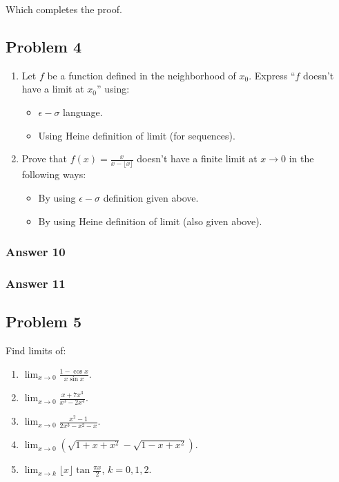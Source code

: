 \documentclass[a4paper]{article}
\begin{document}
Which completes the proof.
\subsection{Problem 4}
\label{sec-1-4}
\begin{enumerate}
\item Let $f$ be a function defined in the neighborhood of $x_0$.
Express ``$f$ doesn't have a limit at $x_0$'' using:
\begin{itemize}
\item $\epsilon-\sigma$ language.
\item Using Heine definition of limit (for sequences).
\end{itemize}

\item Prove that $f(x) = \frac{x}{x - \lfloor x \rfloor}$ doesn't have
a finite limit at $x \to 0$ in the following ways:
\begin{itemize}
\item By using $\epsilon-\sigma$ definition given above.
\item By using Heine definition of limit (also given above).
\end{itemize}
\end{enumerate}

\subsubsection{Answer 10}
\label{sec-1-4-1}

\subsubsection{Answer 11}
\label{sec-1-4-2}
\subsection{Problem 5}
\label{sec-1-5}
Find limits of:
\begin{enumerate}
\item $\lim_{x \to 0}\frac{1 - \cos x}{x \sin x}$.
\item $\lim_{x \to 0}\frac{x + 7x^3}{x^3 - 2x^4}$.
\item $\lim_{x \to 0}\frac{x^2 - 1}{2x^3 - x^2 - x}$.
\item $\lim_{x \to 0}(\sqrt{1 + x + x^2} - \sqrt{1 - x + x^2})$.
\item $\lim_{x \to k}\lfloor x \rfloor \tan \frac{\pi x}{2}$, $k = 0, 1, 2$.
\end{enumerate}
\end{document}
